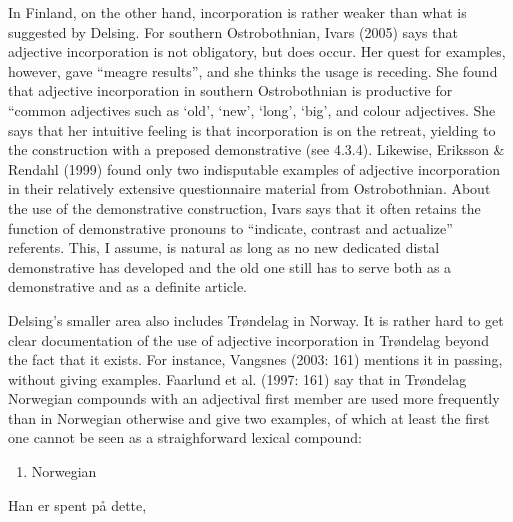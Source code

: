 In Finland, on the other hand, incorporation is rather weaker than what is suggested by Delsing. For southern Ostrobothnian, Ivars (2005) says that adjective incorporation is not obligatory, but does occur. Her quest for examples, however, gave “meagre results”, and she thinks the usage is receding. She found that adjective incorporation in southern Ostrobothnian is productive for “common adjectives such as  ‘old’,  ‘new’,  ‘long’,  ‘big’, and colour adjectives. She says that her intuitive feeling is that incorporation is on the retreat, yielding to the construction with a preposed demonstrative (see 4.3.4).  Likewise, Eriksson \& Rendahl (1999) found only two indisputable examples of adjective incorporation in their relatively extensive questionnaire material from Ostrobothnian. About the use of the demonstrative construction, Ivars says that it often retains the function of demonstrative pronouns to “indicate, contrast and actualize” referents. This, I assume, is natural as long as no new dedicated distal demonstrative has developed and the old one still has to serve both as a demonstrative and as a definite article. 

Delsing’s smaller area also includes Trøndelag in Norway. It is rather hard to get clear documentation of the use of adjective incorporation in Trøndelag beyond the fact that it exists. For instance, Vangsnes (2003: 161) mentions it in passing, without giving examples. Faarlund et al. (1997: 161) say that in Trøndelag Norwegian compounds with an adjectival first member are used more frequently than in Norwegian otherwise and give two examples, of which at least the first one cannot be seen as a straighforward lexical compound: 

\begin{enumerate} %
\item 
Norwegian 

\end{enumerate} %
\ea\label{}
\gll Han  er  spent  på  dette,\\


